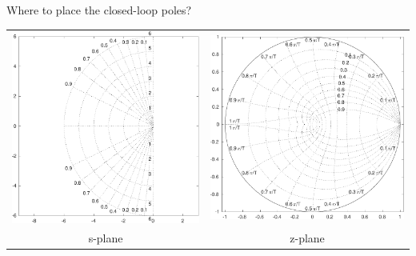 \documentclass[presentation,aspectratio=169]{beamer}
\begin{document}
\begin{frame}[label={sec:orgb7daa22}]{Where to place the closed-loop poles?}
\begin{center}
\begin{tabular}{cc}
 \includegraphics[width=0.41\linewidth]{../../figures/sgrid-crop}
& \includegraphics[width=0.43\linewidth]{../../figures/zgrid-crop}\\
s-plane & z-plane
\end{tabular}
\end{center}
\end{frame}
\end{document}
